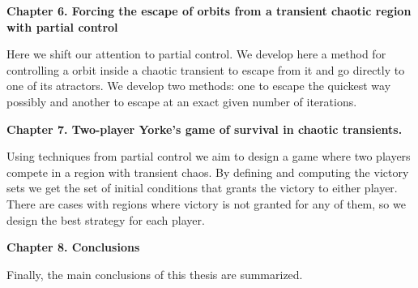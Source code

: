 \vspace{0.6cm}

{\bf  Chapter 6. Forcing the escape of orbits from a transient chaotic region with partial control} 

\vspace{0.6cm}

Here we shift our attention to partial control. We develop here a method for controlling a orbit inside a chaotic transient to escape from it and go directly to one of its atractors. We develop two methods: one to escape the quickest way possibly and another to escape at an exact given number of iterations.

\vspace{0.6cm}


{\bf  Chapter 7. Two-player Yorke's game of survival in chaotic transients.}

\vspace{0.6cm}

Using techniques from partial control we aim to design a game where two players compete in a region with transient chaos. By defining and computing the victory sets we get the set of initial conditions that grants the victory to either player. There are cases with regions where victory is not granted for any of them, so we design the best strategy for each player.


\vspace{0.6cm}

{\bf  Chapter 8. Conclusions}

\vspace{0.6cm}

Finally, the main conclusions of this thesis are summarized.